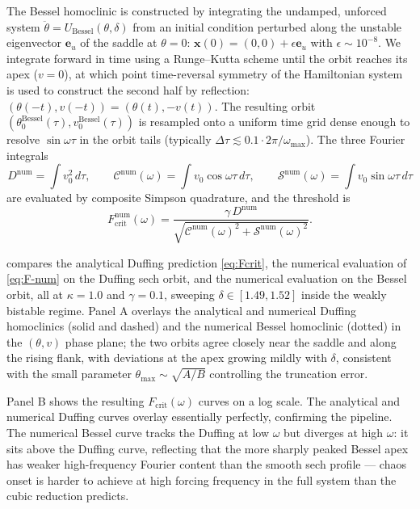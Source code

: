 \documentclass[11pt, a4paper]{article}
\begin{document}
The Bessel homoclinic is constructed by integrating the undamped, unforced
system $\ddot\theta = U_{\mathrm{Bessel}}(\theta, \delta)$ from an initial
condition perturbed along the unstable eigenvector $\mathbf{e}_u$ of the saddle
at $\theta = 0$: $\mathbf{x}(0) = (0,0) + \epsilon\mathbf{e}_u$ with $\epsilon
\sim 10^{-8}$.  We integrate forward in time using a Runge--Kutta scheme until
the orbit reaches its apex ($v = 0$), at which point time-reversal symmetry of
the Hamiltonian system is used to construct the second half by reflection:
$(\theta(-t), v(-t)) = (\theta(t), -v(t))$.  The resulting orbit
$(\theta_0^{\mathrm{Bessel}}(\tau), v_0^{\mathrm{Bessel}}(\tau))$ is resampled
onto a uniform time grid dense enough to resolve $\sin\omega\tau$ in the orbit
tails (typically $\Delta\tau \lesssim 0.1 \cdot 2\pi/\omega_{\max}$).  The
three Fourier integrals
%
\begin{equation}
\label{eq:num-integrals}
D^{\mathrm{num}} = \int v_0^2\,d\tau,
\qquad
\mathcal{C}^{\mathrm{num}}(\omega) = \int v_0\cos\omega\tau\,d\tau,
\qquad
\mathcal{S}^{\mathrm{num}}(\omega) = \int v_0\sin\omega\tau\,d\tau
\end{equation}
%
are evaluated by composite Simpson quadrature, and the threshold is
%
\begin{equation}
\label{eq:F-num}
F^{\mathrm{num}}_{\mathrm{crit}}(\omega)
  = \frac{\gamma\,D^{\mathrm{num}}}
         {\sqrt{\mathcal{C}^{\mathrm{num}}(\omega)^2
                + \mathcal{S}^{\mathrm{num}}(\omega)^2}}.
\tag{33}
\end{equation}

 compares the analytical Duffing prediction \eqref{eq:Fcrit},
the numerical evaluation of \cref{eq:F-num} on the Duffing sech orbit, and the
numerical evaluation on the Bessel orbit, all at $\kappa = 1.0$ and $\gamma =
0.1$, sweeping $\delta \in [1.49, 1.52]$ inside the weakly bistable regime.
Panel A overlays the analytical and numerical Duffing homoclinics (solid and
dashed) and the numerical Bessel homoclinic (dotted) in the $(\theta, v)$ phase
plane; the two orbits agree closely near the saddle and along the rising flank,
with deviations at the apex growing mildly with $\delta$, consistent with the
small parameter $\theta_{\max} \sim \sqrt{A/B}$ controlling the truncation
error.

Panel B shows the resulting $F_{\mathrm{crit}}(\omega)$ curves on a log scale.
The analytical and numerical Duffing curves overlay essentially perfectly,
confirming the pipeline.  The numerical Bessel curve tracks the Duffing at low
$\omega$ but diverges at high $\omega$: it sits above the Duffing curve,
reflecting that the more sharply peaked Bessel apex has weaker high-frequency
Fourier content than the smooth sech profile --- chaos onset is harder to achieve
at high forcing frequency in the full system than the cubic reduction predicts.
\end{document}
